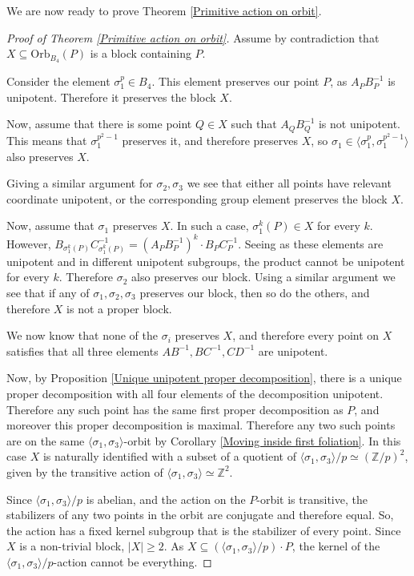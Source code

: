 \documentclass[letterpaper]{amsart}
\begin{document}
We are now ready to prove Theorem \ref{Primitive action on orbit}.
\begin{proof}[Proof of Theorem \ref{Primitive action on orbit}]
    Assume by contradiction that $X\subseteq \mathrm{Orb}_{B_4}(P)$ is a block containing $P$.
    
    Consider the element $\sigma_1^p\in B_4$. This element preserves our point $P$, as $A_PB_P^{-1}$ is unipotent. Therefore it preserves the block $X$.
    
    Now, assume that there is some point $Q\in X$ such that $A_QB_Q^{-1}$ is not unipotent. This means that $\sigma_1^{p^2-1}$ preserves it, and therefore preserves $X$, so $\sigma_1 \in \langle\sigma_1^p, \sigma_1^{p^2 - 1}\rangle$ also preserves $X$.
    
    Giving a similar argument for $\sigma_2,\sigma_3$ we see that either all points have relevant coordinate unipotent, or the corresponding group element preserves the block $X$.
    
    Now, assume that $\sigma_1$ preserves $X$. In such a case, $\sigma_1^k(P) \in X$ for every $k$. However, $B_{\sigma_1^k(P)}C_{\sigma_1^k(P)}^{-1} = (A_PB_P^{-1})^k \cdot B_PC_P^{-1}$. Seeing as these elements are unipotent and in different unipotent subgroups, the product cannot be unipotent for every $k.$ Therefore $\sigma_2$ also preserves our block. Using a similar argument we see that if any of $\sigma_1,\sigma_2,\sigma_3$ preserves our block, then so do the others, and therefore $X$ is not a proper block.
    
    We now know that none of the $\sigma_i$ preserves $X$, and therefore every point on $X$ satisfies that all three elements $AB^{-1},BC^{-1},CD^{-1}$ are unipotent.
    
    Now, by Proposition \ref{Unique unipotent proper decomposition}, there is a unique proper decomposition with all four elements of the decomposition unipotent. Therefore any such point has the same first proper decomposition as $P$, and moreover this proper decomposition is maximal. Therefore any two such points are on the same $\langle \sigma_1,\sigma_3\rangle$-orbit by Corollary \ref{Moving inside first foliation}. In this case $X$ is naturally identified with a subset of a quotient of $\langle \sigma_1, \sigma_3\rangle/p \simeq(\mathbb{Z}/p)^2$, given by the transitive action of $\langle\sigma_1, \sigma_3\rangle \simeq \mathbb{Z}^2.$

    Since $\langle \sigma_1, \sigma_3 \rangle/p$ is abelian, and the action on the $P$-orbit is transitive, the stabilizers of any two points in the orbit are conjugate and therefore equal. So, the action has a fixed kernel subgroup that is the stabilizer of every point. Since $X$ is a non-trivial block, $|X| \geq 2$. As $X \subseteq (\langle\sigma_1, \sigma_3\rangle/p) \cdot P$, the kernel of the $\langle \sigma_1, \sigma_3 \rangle/p$-action cannot be everything.
    

\end{proof}
\end{document}
